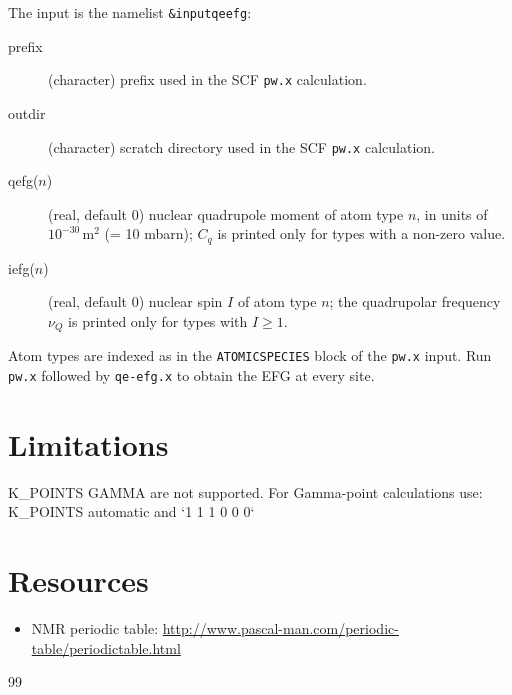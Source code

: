 \documentclass[a4paper,11pt,twoside]{article}
\begin{document}
The input is the namelist \texttt{\&input\textunderscore{}qeefg}:
\begin{description}
\item[prefix] (character) prefix used in the SCF \texttt{pw.x} calculation.
\item[outdir] (character) scratch directory used in the SCF \texttt{pw.x} calculation.
\item[q\textunderscore{}efg($n$)] (real, default $0$) nuclear quadrupole moment of atom type $n$,
in units of $10^{-30}\,\mathrm{m}^2$ (= 10 mbarn); $C_q$ is printed only for types with a non-zero value.
\item[i\textunderscore{}efg($n$)] (real, default $0$) nuclear spin $I$ of atom type $n$; the
quadrupolar frequency $\nu_Q$ is printed only for types with $I \ge 1$.
\end{description}
Atom types are indexed as in the \texttt{ATOMIC\textunderscore{}SPECIES} block of the \texttt{pw.x}
input. Run \texttt{pw.x} followed by \texttt{qe-efg.x} to obtain the EFG at every site.

\section{Limitations}
K\_POINTS GAMMA are not supported. For Gamma-point calculations use: K\_POINTS automatic and `1 1 1 0 0 0`


\section{Resources}
\begin{itemize}

\item NMR periodic table: \url{http://www.pascal-man.com/periodic-table/periodictable.html}

\end{itemize}


\begin{thebibliography}{99}
\bibitem{}
  

\end{thebibliography}

\end{document}
